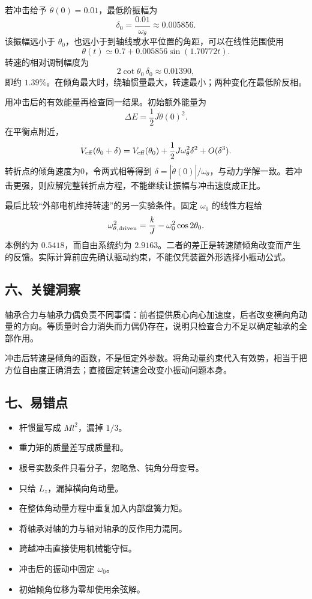 \documentclass[12pt,a4paper,fontset=fandol]{ctexart}
\providecommand{\tightlist}{\setlength{\itemsep}{0pt}\setlength{\parskip}{0pt}}
\begin{document}
若冲击给予 \(\dot\theta(0)=0.01\)，最低阶振幅为 \[
\delta_0=\frac{0.01}{\omega_\theta}\approx0.005856.
\] 该振幅远小于
\(\theta_0\)，也远小于到轴线或水平位置的角距，可以在线性范围使用 \[
\theta(t)\simeq0.7+0.005856\sin(1.70772t).
\] 转速的相对调制幅度为 \[
2\cot\theta_0\,\delta_0\approx0.01390,
\] 即约
\(1.39\%\)。在倾角最大时，绕轴惯量最大，转速最小；两种变化在最低阶反相。

用冲击后的有效能量再检查同一结果。初始额外能量为 \[
\Delta E=\frac12J\dot\theta(0)^2.
\] 在平衡点附近， \[
V_{\rm eff}(\theta_0+\delta)
=V_{\rm eff}(\theta_0)+\frac12J\omega_\theta^2\delta^2
+O(\delta^3).
\] 转折点的倾角速度为0，令两式相等得到
\(\delta=|\dot\theta(0)|/\omega_\theta\)，与动力学解一致。若冲击更强，则应解完整转折点方程，不能继续让振幅与冲击速度成正比。

最后比较``外部电机维持转速''的另一实验条件。固定 \(\omega_0\)
的线性方程给 \[
\omega_{\theta,\rm driven}^2
=\frac{k}{J}-\omega_0^2\cos2\theta_0.
\] 本例约为 \(0.5418\)，而自由系统约为
\(2.9163\)。二者的差正是转速随倾角改变而产生的反馈。实际计算前应先确认驱动约束，不能仅凭装置外形选择小振动公式。

\subsection{六、关键洞察}\label{ux516dux5173ux952eux6d1eux5bdf-5}

轴承合力与轴承力偶负责不同事情：前者提供质心向心加速度，后者改变横向角动量的方向。等质量时合力消失而力偶仍存在，说明只检查合力不足以确定轴承的全部作用。

冲击后转速是倾角的函数，不是恒定外参数。将角动量约束代入有效势，相当于把方位自由度正确消去；直接固定转速会改变小振动问题本身。

\subsection{七、易错点}\label{ux4e03ux6613ux9519ux70b9-5}

\begin{itemize}
\tightlist
\item
  杆惯量写成 \(Ml^2\)，漏掉 \(1/3\)。
\item
  重力矩的质量差写成质量和。
\item
  根号实数条件只看分子，忽略急、钝角分母变号。
\item
  只给 \(L_z\)，漏掉横向角动量。
\item
  在整体角动量方程中重复加入内部盘簧力矩。
\item
  将轴承对轴的力与轴对轴承的反作用力混同。
\item
  跨越冲击直接使用机械能守恒。
\item
  冲击后的振动中固定 \(\omega_0\)。
\item
  初始倾角位移为零却使用余弦解。
\end{itemize}
\end{document}
